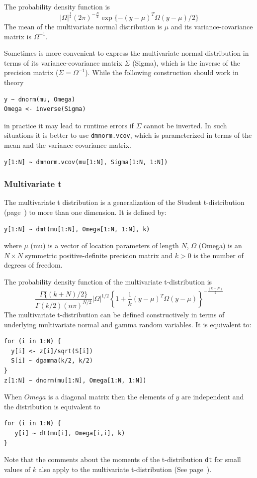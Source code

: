 \documentclass[11pt, a4paper, titlepage]{report}
\begin{document}
The probability density function is
\[
|\Omega|^{\frac{1}{2}} \left(2\pi\right)^{-\frac{N}{2}}
\exp\{-(y-\mu)^T \Omega (y-\mu) / 2\}
\]
The mean of the multivariate normal distribution is $\mu$ and its
variance-covariance matrix is $\Omega^{-1}$.

Sometimes is more convenient to express the multivariate normal
distribution in terms of its variance-covariance matrix $\Sigma$ (Sigma),
which is the inverse of the precision matrix ($\Sigma = \Omega^{-1}$).
While the following construction should work in theory
\begin{verbatim}
y ~ dnorm(mu, Omega)
Omega <- inverse(Sigma)
\end{verbatim}
in practice it may lead to runtime errors if $\Sigma$ cannot be inverted.
In such situations it is better to use \texttt{dmnorm.vcov}, which
is parameterized in terms of the mean and the variance-covariance matrix.
\begin{verbatim}
y[1:N] ~ dmnorm.vcov(mu[1:N], Sigma[1:N, 1:N])
\end{verbatim}

\subsubsection{Multivariate t}

The multivariate t distribution is a generalization of the Student
t-distribution (page~\pageref{bugs:dt}) to more than one dimension. It
is defined by:
\begin{verbatim}
y[1:N] ~ dmt(mu[1:N], Omega[1:N, 1:N], k)
\end{verbatim}
where $\mu$ (mu) is a vector of location parameters of length $N$,
$\Omega$ (Omega) is an $N \times N$ symmetric positive-definite
precision matrix and $k > 0$ is the number of degrees of freedom.

The probability density function of the multivariate t-distribution is
\[
\frac{\textstyle \Gamma \{(k+N)/2\}}{\textstyle \Gamma(k/2) (n\pi)^{N/2}}
|\Omega|^{1/2}
\left\{1 + \frac{1}{k} (y - \mu)^T \Omega (y - \mu) \right\}^{-\frac{(k+N)}{2}}
\]
The multivariate t-distribution can be defined constructively in terms
of underlying multivariate normal and gamma random variables. It is
equivalent to:
\begin{verbatim}
for (i in 1:N) {
  y[i] <- z[i]/sqrt(S[i])
  S[i] ~ dgamma(k/2, k/2)
}
z[1:N] ~ dnorm(mu[1:N], Omega[1:N, 1:N])
\end{verbatim}

When $Omega$ is a diagonal matrix then the elements of $y$ are independent
and the distribution is equivalent to 
\begin{verbatim}
for (i in 1:N) {
   y[i] ~ dt(mu[i], Omega[i,i], k)
}
\end{verbatim}
Note that the comments about the moments of the t-distribution \texttt{dt} for
small values of $k$ also apply to the multivariate t-distribution (See
page~\pageref{bugs:dt}).
\end{document}
